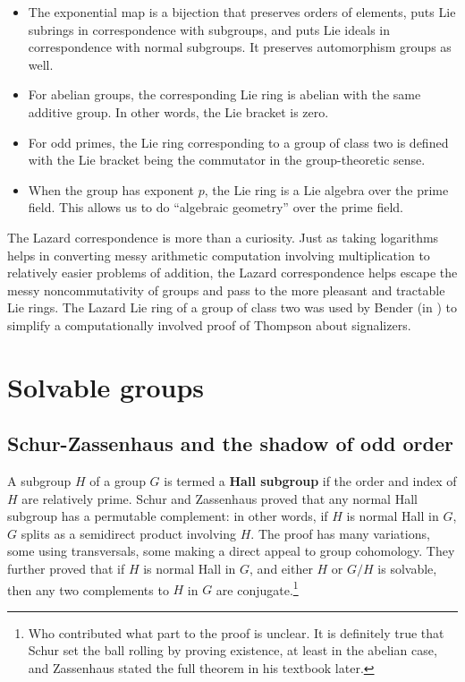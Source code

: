 \documentclass{amsart}
\renewcommand{\definedind}[1]{{\bf #1}}
\begin{document}
\begin{itemize}

\item The exponential map is a bijection that preserves orders of
  elements, puts Lie subrings in correspondence with subgroups, and
  puts Lie ideals in correspondence with normal subgroups. It
  preserves automorphism groups as well.

\item For abelian groups, the corresponding Lie ring is abelian with
  the same additive group. In other words, the Lie bracket is zero.

\item For odd primes, the Lie ring corresponding to a group of class
  two is defined with the Lie bracket being the commutator in the
  group-theoretic sense.

\item When the group has exponent $p$, the Lie ring is a Lie algebra
  over the prime field. This allows us to do ``algebraic geometry''
  over the prime field.

\end{itemize}

The Lazard correspondence is more than a curiosity. Just as taking
logarithms helps in converting messy arithmetic computation involving
multiplication to relatively easier problems of addition, the Lazard
correspondence helps escape the messy noncommutativity of groups and
pass to the more pleasant and tractable Lie rings. The Lazard Lie ring
of a group of class two was used by Bender (in
\cite{benderonthompson}) to simplify a computationally involved proof
of Thompson about signalizers.

\section{Solvable groups}

\subsection{Schur-Zassenhaus and the shadow of odd order}

A subgroup $H$ of a group $G$ is termed a \definedind{Hall subgroup}
if the order and index of $H$ are relatively prime. Schur and
Zassenhaus proved that any normal Hall subgroup has a permutable
complement: in other words, if $H$ is normal Hall in $G$, $G$ splits
as a semidirect product involving $H$. The proof has many variations,
some using transversals, some making a direct appeal to group
cohomology. They further proved that if $H$ is normal Hall in $G$, and
either $H$ or $G/H$ is solvable, then any two complements to $H$ in
$G$ are conjugate.\footnote{Who contributed what part to the proof is
  unclear. It is definitely true that Schur set the ball rolling by
  proving existence, at least in the abelian case, and Zassenhaus
  stated the full theorem in his textbook later.}
\end{document}
